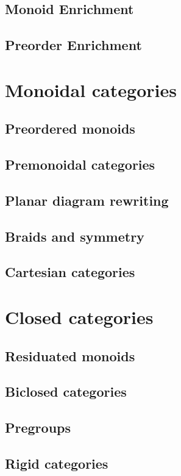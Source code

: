     \section{Monoid Enrichment}
    \section{Preorder Enrichment}

\chapter{Monoidal categories}

    \section{Preordered monoids}
    \section{Premonoidal categories}
    \section{Planar diagram rewriting}
    \section{Braids and symmetry}
    \section{Cartesian categories}

\chapter{Closed categories}

    \section{Residuated monoids}
    \section{Biclosed categories}
    \section{Pregroups}
    \section{Rigid categories}
